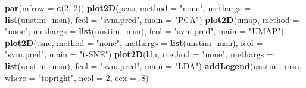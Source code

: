 \documentclass[9pt,a4paper,]{extarticle}
\newenvironment{Shaded}{\begin{snugshade}}{\end{snugshade}}
\newcommand{\AttributeTok}[1]{\textcolor[rgb]{0.13,0.29,0.53}{#1}}
\newcommand{\DecValTok}[1]{\textcolor[rgb]{0.00,0.00,0.81}{#1}}
\newcommand{\FunctionTok}[1]{\textcolor[rgb]{0.13,0.29,0.53}{\textbf{#1}}}
\newcommand{\NormalTok}[1]{#1}
\newcommand{\StringTok}[1]{\textcolor[rgb]{0.31,0.60,0.02}{#1}}
\begin{document}
\begin{Shaded}
\begin{Highlighting}[]
\FunctionTok{par}\NormalTok{(}\AttributeTok{mfrow =} \FunctionTok{c}\NormalTok{(}\DecValTok{2}\NormalTok{, }\DecValTok{2}\NormalTok{))}
\FunctionTok{plot2D}\NormalTok{(pcas, }\AttributeTok{method =} \StringTok{"none"}\NormalTok{, }\AttributeTok{methargs =} \FunctionTok{list}\NormalTok{(unstim\_msn), }
       \AttributeTok{fcol =} \StringTok{"svm.pred"}\NormalTok{, }\AttributeTok{main =} \StringTok{"PCA"}\NormalTok{)}
\FunctionTok{plot2D}\NormalTok{(umap, }\AttributeTok{method =} \StringTok{"none"}\NormalTok{, }\AttributeTok{methargs =} \FunctionTok{list}\NormalTok{(unstim\_msn), }
       \AttributeTok{fcol =} \StringTok{"svm.pred"}\NormalTok{, }\AttributeTok{main =} \StringTok{"UMAP"}\NormalTok{)}
\FunctionTok{plot2D}\NormalTok{(tsne, }\AttributeTok{method =} \StringTok{"none"}\NormalTok{, }\AttributeTok{methargs =} \FunctionTok{list}\NormalTok{(unstim\_msn), }
       \AttributeTok{fcol =} \StringTok{"svm.pred"}\NormalTok{, }\AttributeTok{main =} \StringTok{"t{-}SNE"}\NormalTok{)}
\FunctionTok{plot2D}\NormalTok{(lda, }\AttributeTok{method =} \StringTok{"none"}\NormalTok{, }\AttributeTok{methargs =} \FunctionTok{list}\NormalTok{(unstim\_msn), }
       \AttributeTok{fcol =} \StringTok{"svm.pred"}\NormalTok{, }\AttributeTok{main =} \StringTok{"LDA"}\NormalTok{)}
\FunctionTok{addLegend}\NormalTok{(unstim\_msn, }\AttributeTok{where =} \StringTok{"topright"}\NormalTok{, }\AttributeTok{ncol =} \DecValTok{2}\NormalTok{, }\AttributeTok{cex =}\NormalTok{ .}\DecValTok{8}\NormalTok{)}
\end{Highlighting}
\end{Shaded}
\end{document}
